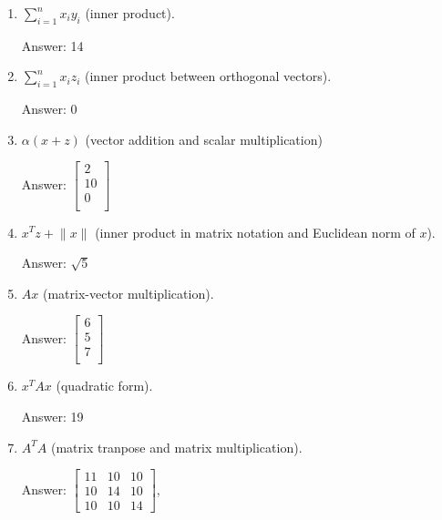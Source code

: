 \documentclass{article}
\newenvironment{answer}{\par\begingroup\color{gre}Answer: }{\endgroup}
\newcommand{\norm}[1]{\lVert #1 \rVert}
\begin{document}
  \begin{enumerate}
  \item $\sum_{i=1}^n x_iy_i$ (inner product).
    \begin{answer}
      14
    \end{answer}
  \item $\sum_{i=1}^n x_i z_i$ (inner product between orthogonal vectors).
    \begin{answer}
      0
    \end{answer}
  \item $\alpha(x+z)$ (vector addition and scalar multiplication)
    \begin{answer}
        $\left[\begin{array}{c}
          2\\
          10\\
          0\\
          \end{array}\right]$
    \end{answer}
  
  \item $x^Tz + \norm{x}$ (inner product in matrix notation and Euclidean norm of $x$).
  \begin{answer}
      $\sqrt{5}$
  \end{answer}
  \item $Ax$ (matrix-vector multiplication).
      \begin{answer}
        $\left[\begin{array}{c}
          6\\
          5\\
          7\\
          \end{array}\right]$
    \end{answer}
  \item $x^TAx$ (quadratic form).
  \begin{answer}
      19
  \end{answer}
  \item $A^TA$ (matrix tranpose and matrix multiplication).
  \begin{answer}
    $\left[\begin{array}{ccc}
    11 & 10 & 10\\
    10 & 14 & 10\\
    10 & 10 & 14
  \end{array}\right]$,
  \end{answer}
  \end{enumerate}
\end{document}
